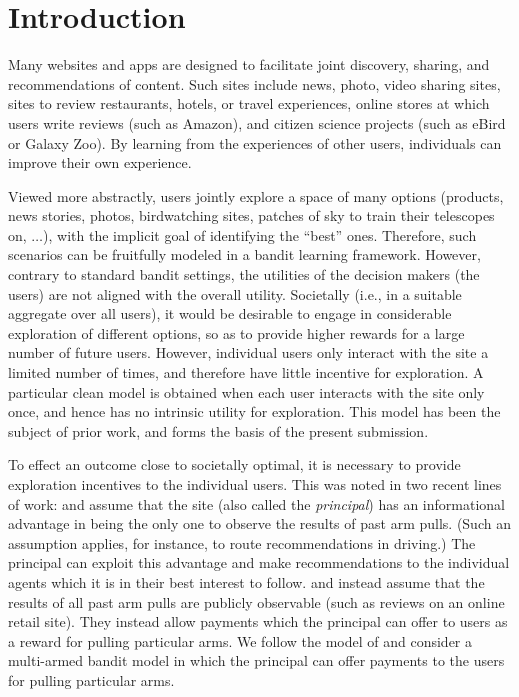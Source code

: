 \section{Introduction}

Many websites and apps are designed to facilitate joint discovery,
sharing, and recommendations of content.
Such sites include news, photo,  video sharing sites,
sites to review restaurants, hotels, or travel experiences,
online stores at which users write reviews (such as Amazon),
and citizen science projects
(such as eBird \citep{sullivan2009ebird} or Galaxy Zoo).
By learning from the experiences of other users, individuals can improve their own experience.

Viewed more abstractly, users jointly explore a space of
many options (products, news stories, photos, birdwatching sites,
patches of sky to train their telescopes on, $\ldots$),
with the implicit goal of identifying the ``best'' ones.
Therefore, such scenarios can be fruitfully modeled in a bandit
learning framework.
However, contrary to standard bandit settings, the utilities of the
decision makers (the users) are not aligned with the overall utility.
Societally (i.e., in a suitable aggregate over all users),
it would be desirable to engage in considerable exploration of
different options, so as to provide higher rewards for a large number
of future users.
However, individual users only interact with the site a limited number
of times, and therefore have little incentive for exploration.
A particular clean model is obtained when each user interacts with the
site only once, and hence has no intrinsic utility for exploration. 
This model has been the subject of prior work, and forms the basis of
the present submission.

To effect an outcome close to societally optimal,
it is necessary to provide exploration incentives to the individual users.
This was noted in two recent lines of work:
\citet{kremer2014implementing}
and \citet{mansour2015bayesian,mansour2016bayesian}
assume that the site (also called the \emph{principal}) has an
informational advantage in being the only one to observe the results
of past arm pulls.
(Such an assumption applies, for instance, to route recommendations in
driving.)
The principal can exploit this advantage and make recommendations to
the individual agents which it is in their best interest to follow.
\citet{frazier2014incentivizing} and 
\citet{han2015incentivizing} instead assume that the results of all
past arm pulls are publicly observable
(such as reviews on an online retail site).
They instead allow payments which the principal can offer to users as
a reward for pulling particular arms.
We follow the model of \citet{frazier2014incentivizing,han2015incentivizing}
and consider a multi-armed bandit model in which the principal can
offer payments to the users for pulling particular arms.


